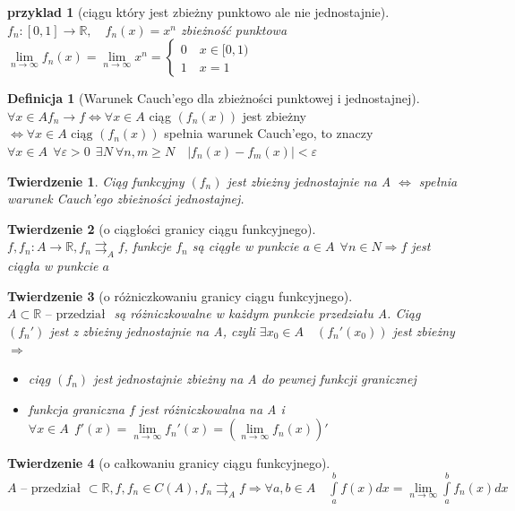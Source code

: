 \documentclass[12pt,a4paper]{article}
\newtheorem{tw}{Twierdzenie}
\newtheorem{przyklad}{przyklad}
\theoremstyle{definition}
\newtheorem{df}{Definicja}
\begin{document}
\begin{przyklad}[ciągu który jest zbieżny punktowo ale nie jednostajnie]
$f_n: [0,1] \to \mathbb{R}, \quad f_n(x) = x^n$ zbieżność punktowa
$
	\lim\limits_{n\to\infty}f_n(x) = \lim\limits_{n\to\infty}x^n = 
	\begin{cases}
	0 \quad x\in[0,1)\\
	1 \quad x=1
	\end{cases}
$
\end{przyklad}

\begin{df}[Warunek Cauch'ego dla zbieżności punktowej i jednostajnej]~\\
$\forall x\in A f_n \rightarrow f \Leftrightarrow \forall x\in A$ ciąg $(f_n(x))$ jest zbieżny $\Leftrightarrow \forall x\in A \text{ ciąg } (f_n(x))$ spełnia warunek Cauch'ego, to znaczy 
$\forall x\in A ~~ \forall \varepsilon>0 ~~ \exists N ~ \forall n,m \geqslant N \quad |f_n(x) - f_m(x)| < \varepsilon$ 
\end{df}

\begin{tw}
Ciąg funkcyjny $(f_n)$ jest zbieżny jednostajnie na A $\Leftrightarrow$ spełnia warunek Cauch'ego zbieżności jednostajnej.
\end{tw}

\begin{tw}[o ciągłości granicy ciągu funkcyjnego]~\\
$f, f_n: A\to \mathbb{R}, f_n \rightrightarrows_A f$, funkcje $f_n$ są ciągłe w punkcie $a\in A ~~ \forall n\in N \Rightarrow f$ jest ciągła w punkcie $a$
\end{tw}

\begin{tw}[o różniczkowaniu granicy ciągu funkcyjnego]~\\
$A \subset \mathbb{R} \text{ -- przedział }$ są różniczkowalne w każdym punkcie przedziału A. Ciąg $(f_n')$ jest z zbieżny jednostajnie na A, czyli $\exists x_0 \in A  \quad (f_n'(x_0))$ jest zbieżny $\Rightarrow$
\begin{itemize}
	\item ciąg $(f_n)$ jest jednostajnie zbieżny na A do pewnej funkcji granicznej
	\item funkcja graniczna $f$ jest różniczkowalna na A i $\forall x\in A ~~ f'(x) = \lim\limits_{n\to\infty} f_n'(x) = (\lim\limits_{n\to\infty} f_n(x))'$
\end{itemize}
\end{tw}

\begin{tw}[o całkowaniu granicy ciągu funkcyjnego]~\\
$A \text{ -- przedział } \subset \mathbb{R}, f, f_n \in C(A), f_n \rightrightarrows_A f \Rightarrow \forall a,b \in A \quad \int\limits_a^bf(x)dx = \lim\limits_{n\to\infty}\int\limits_a^bf_n(x)dx$ 
\end{tw}
\end{document}
